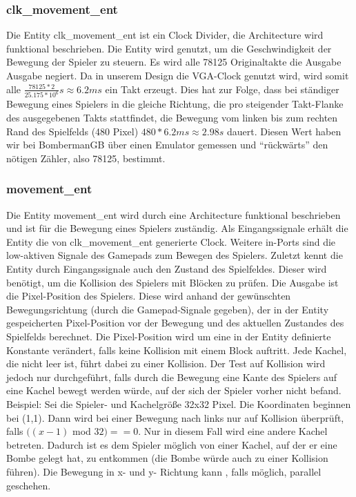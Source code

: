 \documentclass[parskip=full]{scrartcl}
\begin{document}
				\subsubsection{clk\_movement\_ent}
				Die Entity clk\_movement\_ent ist ein Clock Divider, die Architecture wird funktional beschrieben. Die Entity wird genutzt, um die Geschwindigkeit der Bewegung der Spieler zu steuern. Es wird alle 78125 Originaltakte die Ausgabe Ausgabe negiert. Da in unserem Design die VGA-Clock genutzt wird, wird somit alle $\frac{78125 * 2}{25.175 * 10^6}s \approx 6.2ms$ ein Takt erzeugt. Dies hat zur Folge, dass bei ständiger Bewegung eines Spielers in die gleiche Richtung, die pro steigender Takt-Flanke des ausgegebenen Takts stattfindet, die Bewegung vom linken bis zum rechten Rand des Spielfelds (480 Pixel) $480 * 6.2 ms \approx 2.98 s$ dauert. Diesen Wert haben wir bei BombermanGB über einen Emulator gemessen und \enquote{rückwärts} den nötigen Zähler, also 78125, bestimmt.
				\subsubsection{movement\_ent}
					Die Entity movement\_ent wird durch eine Architecture funktional beschrieben und ist für die Bewegung eines Spielers zuständig. Als Eingangssignale erhält die Entity die von clk\_movement\_ent generierte Clock. Weitere in-Ports sind die low-aktiven Signale des Gamepads zum Bewegen des Spielers. Zuletzt kennt die Entity durch Eingangssignale auch den Zustand des Spielfeldes. Dieser wird benötigt, um die Kollision des Spielers mit Blöcken zu prüfen.
					Die Ausgabe ist die Pixel-Position des Spielers.
					Diese wird anhand der gewünschten Bewegungsrichtung (durch die Gamepad-Signale gegeben), der in der Entity gespeicherten Pixel-Position vor der Bewegung und des aktuellen Zustandes des Spielfelds berechnet. Die Pixel-Position wird um eine in der Entity definierte Konstante verändert, falls keine Kollision mit einem Block auftritt. Jede Kachel, die nicht leer ist, führt dabei zu einer Kollision.
					Der Test auf Kollision wird jedoch nur durchgeführt, falls durch die Bewegung eine Kante des Spielers auf eine Kachel bewegt werden würde, auf der sich der Spieler vorher nicht befand. \newline
					Beispiel: Sei die Spieler- und Kachelgröße 32x32 Pixel. Die Koordinaten beginnen bei (1,1). Dann wird bei einer Bewegung nach links nur auf Kollision überprüft, falls $((x-1)$ mod $32) == 0$. Nur in diesem Fall wird eine andere Kachel betreten.\newline
					Dadurch ist es dem Spieler möglich von einer Kachel, auf der er eine Bombe gelegt hat, zu entkommen (die Bombe würde auch zu einer Kollision führen).
					Die Bewegung in x- und y- Richtung kann , falls möglich, parallel geschehen.
\end{document}
